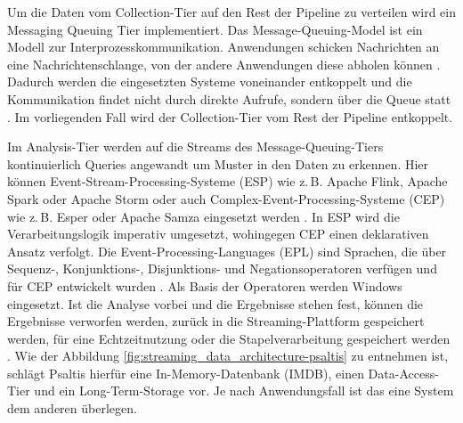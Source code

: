 Um die Daten vom Collection-Tier auf den Rest der Pipeline zu verteilen wird ein Messaging Queuing Tier implementiert.
Das Message-Queuing-Model ist ein Modell zur Interprozesskommunikation. Anwendungen schicken
Nachrichten an eine Nachrichtenschlange, von der andere Anwendungen diese abholen können \cite{gray2003interprocess}.
Dadurch werden die eingesetzten Systeme voneinander entkoppelt und die Kommunikation findet nicht durch direkte Aufrufe,
sondern über die Queue statt \cite{psaltis2017streaming}. Im vorliegenden Fall wird der Collection-Tier vom Rest der Pipeline entkoppelt.

Im Analysis-Tier werden auf die Streams des Message-Queuing-Tiers kontinuierlich Queries angewandt um Muster in den Daten zu erkennen.
Hier können Event-Stream-Processing-Systeme (ESP) wie z.\,B. Apache Flink, Apache Spark oder Apache Storm oder
auch Complex-Event-Processing-Systeme (CEP) wie z.\,B. Esper oder Apache Samza eingesetzt werden \cite{psaltis2017streaming}.
In ESP wird die Verarbeitungslogik imperativ umgesetzt, wohingegen CEP einen deklarativen Ansatz verfolgt.
Die Event-Processing-Languages (EPL) sind Sprachen, die über Sequenz-, Konjunktions-, Disjunktions- und Negationsoperatoren
verfügen und für CEP entwickelt wurden \cite{hedtstck2017complex}. Als Basis der Operatoren werden Windows eingesetzt.
Ist die Analyse vorbei und die Ergebnisse stehen fest, können die Ergebnisse verworfen werden, zurück in die Streaming-Plattform gespeichert werden,
für eine Echtzeitnutzung oder die Stapelverarbeitung gespeichert werden \cite{psaltis2017streaming}. Wie der Abbildung \ref{fig:streaming_data_architecture-psaltis}
zu entnehmen ist, schlägt Psaltis hierfür eine In-Memory-Datenbank (IMDB), einen Data-Access-Tier und ein Long-Term-Storage vor.
Je nach Anwendungsfall ist das eine System dem anderen überlegen.

